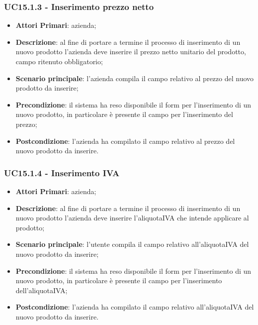 \subsubsection{UC15.1.3 - Inserimento prezzo netto}
\begin{itemize}
	\item \textbf{Attori Primari}: azienda;
	\item \textbf{Descrizione}: al fine di portare a termine il processo di inserimento di un nuovo prodotto l'azienda deve inserire il prezzo netto unitario del prodotto, campo ritenuto obbligatorio;
	\item \textbf{Scenario principale}: l'azienda compila il campo relativo al prezzo del nuovo prodotto da inserire;
	\item \textbf{Precondizione}: il sistema ha reso disponibile il form per l'inserimento di un nuovo prodotto, in particolare è presente il campo per l'inserimento del prezzo;
	\item \textbf{Postcondizione}: l'azienda ha compilato il campo relativo al prezzo del nuovo prodotto da inserire.
\end{itemize}
\subsubsection{UC15.1.4 - Inserimento IVA}
\begin{itemize}
	\item \textbf{Attori Primari}: azienda;
	\item \textbf{Descrizione}: al fine di portare a termine il processo di inserimento di un nuovo prodotto l'azienda deve inserire l'aliquota\glosp IVA che intende applicare al prodotto;
	\item \textbf{Scenario principale}: l'utente compila il campo relativo all'aliquota\glosp IVA del nuovo prodotto da inserire;
	\item \textbf{Precondizione}: il sistema ha reso disponibile il form per l'inserimento di un nuovo prodotto, in particolare è presente il campo per l'inserimento dell'aliquota\glosp IVA;
	\item \textbf{Postcondizione}: l'azienda ha compilato il campo relativo all'aliquota\glosp IVA del nuovo prodotto da inserire.
\end{itemize}
